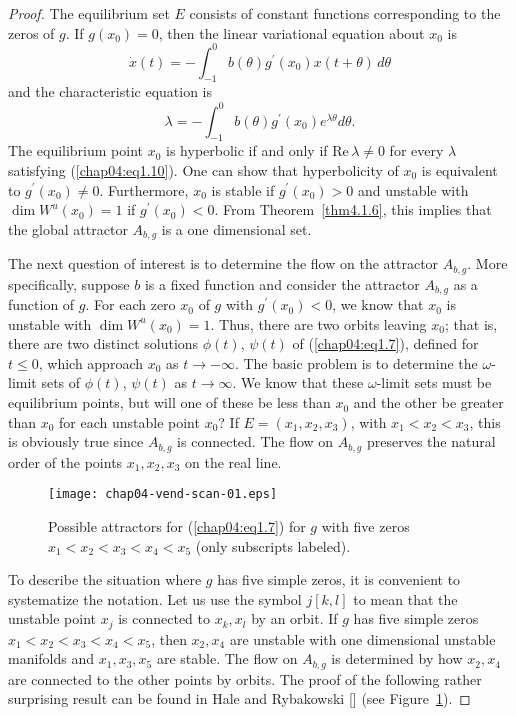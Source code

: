\documentclass{surv-l}
\theoremstyle{plain}
\theoremstyle{definition}
\numberwithin{equation}{section}
\numberwithin{figure}{chapter}
\begin{document}
\begin{proof}
The equilibrium set $E$ consists of constant functions corresponding to the zeros of $g$. If $g(x_{0})=0$, then the linear variational equation about $x_{0}$ is
\begin{equation*}
\dot{x}(t)=\displaystyle-\int_{-1}^{0}b(\theta)g^{\prime}(x_{0})x(t+\theta)\,d\theta
\end{equation*}
and the characteristic equation is
\begin{equation}\label{chap04:eq1.10}
\lambda=-\int_{-1}^{0}b(\theta)g^{\prime}(x_{0})e^{\lambda\theta}d\theta.
\end{equation}
The equilibrium point $x_{0}$ is hyperbolic if and only if $\mathrm{Re}\,\lambda\neq 0$ for every $\lambda$ satisfying (\ref{chap04:eq1.10}). One can show that hyperbolicity of $x_{0}$ is equivalent to $ g^{\prime}(x_{0})\neq 0$. Furthermore, $x_{0}$ is stable if $g^{\prime}(x_{0})>0$ and unstable with $\dim W^{u}(x_{0})=1$ if $g^{\prime}(x_{0})<0$. From Theorem~\ref{thm4.1.6}, this implies that the global attractor $A_{b,g}$ is a one dimensional set.

The next question of interest is to determine the flow on the attractor $A_{b,g}$. More specifically, suppose $b$ is a fixed function and consider the attractor $A_{b,g}$ as a function of $g$. For each zero $x_{0}$ of $g$ with $g^{\prime}(x_{0})<0$, we know that $x_{0}$ is unstable with $\dim W^{u}(x_{0})=1$. Thus, there are two orbits leaving $x_{0}$; that is, there are two distinct solutions $\phi(t)$, $\psi(t)$ of (\ref{chap04:eq1.7}), defined for $t\leq 0$, which approach $x_{0}$ as $ t\rightarrow-\infty$. The basic problem is to determine the $\omega$-limit sets of $\phi(t)$, $\psi(t)$ as $ t\rightarrow\infty$. We know that these $\omega$-limit sets must be equilibrium points, but will one of these be less than $x_{0}$ and the other be greater than $x_{0}$ for each unstable point $x_{0}$? If $E=(x_{1}, x_{2}, x_{3})$, with $x_{1}<x_{2}<x_{3}$, this is obviously true since $A_{b,g}$ is connected. The flow on $A_{b,g}$ preserves the natural order of the points $x_{1},x_{2},x_{3}$ on the real line.
\renewcommand\thefigure{\arabic{section}.\arabic{figure}}
\begin{figure}
\texttt{[image: chap04-vend-scan-01.eps]}
\caption{Possible attractors for (\ref{chap04:eq1.7}) for $g$ with five zeros $x_{1}<x_{2}< x_{3}<x_{4}<x_{5}$ (only subscripts labeled).}
\label{chap04:fig1.1}
\end{figure}

To describe the situation where $g$ has five simple zeros, it is convenient to systematize the notation. Let us use the symbol $j[k, l]$ to mean that the unstable point $x_{j}$ is connected to $x_{k},x_{l}$ by an orbit. If $g$ has five simple zeros $x_{1}< x_{2}<x_{3}<x_{4}<x_{5}$, then $x_{2}, x_{4}$ are unstable with one dimensional unstable manifolds and $x_{1},x_{3},x_{5}$ are stable. The flow on $A_{b,g}$ is determined by how $x_{2},x_{4}$ are connected to the other points by orbits. The proof of the following rather surprising result can be found in Hale and Rybakowski [\citeyear{1982hr}] (see Figure~\ref{chap04:fig1.1}).
\end{proof}
\end{document}

